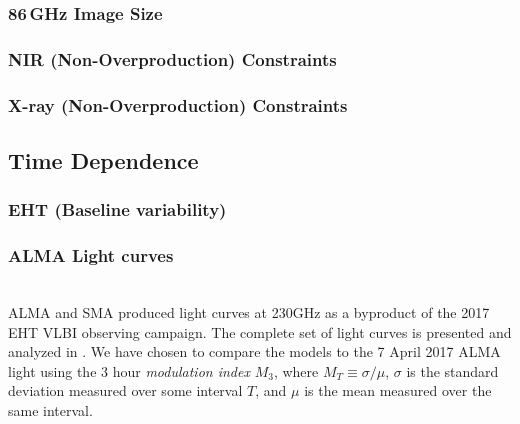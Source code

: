 \subsubsection{86\,GHz Image Size}

\subsubsection{NIR (Non-Overproduction) Constraints}

\subsubsection{X-ray (Non-Overproduction) Constraints}

\subsection{Time Dependence}


\subsubsection{EHT (Baseline variability)}


\subsubsection{ALMA Light curves}
\\
ALMA and SMA produced \sgra light curves at 230GHz as a byproduct of the
2017 EHT VLBI observing campaign. The complete set of light curves is presented and analyzed in \cite{wielgus2021}. We have chosen to compare the models to the 7 April 2017 ALMA light using
the 3 hour {\em modulation index} $M_3$, where $M_T \equiv
\sigma/\mu$, $\sigma$ is the standard deviation measured over some
interval $T$, and $\mu$ is the mean measured over the same interval.

